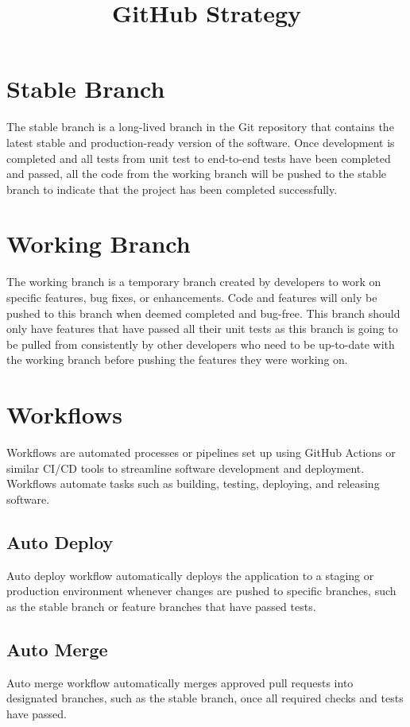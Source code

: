 \documentclass{article}
\title{GitHub Strategy}
\author{}
\date{}
\begin{document}
\maketitle

\section{Stable Branch}
The stable branch is a long-lived branch in the Git repository that contains the latest stable and production-ready version of the software. Once development is completed and all tests from unit test to end-to-end tests have been completed and passed, all the code from the working branch will be pushed to the stable branch to indicate that the project has been completed successfully.

\section{Working Branch}
The working branch is a temporary branch created by developers to work on specific features, bug fixes, or enhancements. Code and features will only be pushed to this branch when deemed completed and bug-free. This branch should only have features that have passed all their unit tests as this branch is going to be pulled from consistently by other developers who need to be up-to-date with the working branch before pushing the features they were working on.

\section{Workflows}
Workflows are automated processes or pipelines set up using GitHub Actions or similar CI/CD tools to streamline software development and deployment. Workflows automate tasks such as building, testing, deploying, and releasing software.
\subsection{Auto Deploy}
Auto deploy workflow automatically deploys the application to a staging or production environment whenever changes are pushed to specific branches, such as the stable branch or feature branches that have passed tests.
\subsection{Auto Merge}
Auto merge workflow automatically merges approved pull requests into designated branches, such as the stable branch, once all required checks and tests have passed.
\end{document}
